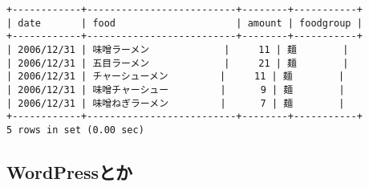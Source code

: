 \documentclass{jlreq}
\begin{document}
\begin{enumerate}
\begin{lstlisting}
+------------+--------------------------+--------+-----------+
| date       | food                     | amount | foodgroup |
+------------+--------------------------+--------+-----------+
| 2006/12/31 | 味噌ラーメン             |     11 | 麺        |
| 2006/12/31 | 五目ラーメン             |     21 | 麺        |
| 2006/12/31 | チャーシューメン         |     11 | 麺        |
| 2006/12/31 | 味噌チャーシュー         |      9 | 麺        |
| 2006/12/31 | 味噌ねぎラーメン         |      7 | 麺        |
+------------+--------------------------+--------+-----------+
5 rows in set (0.00 sec)
\end{lstlisting}
\end{enumerate}
\subsection{WordPressとか}
\end{document}

